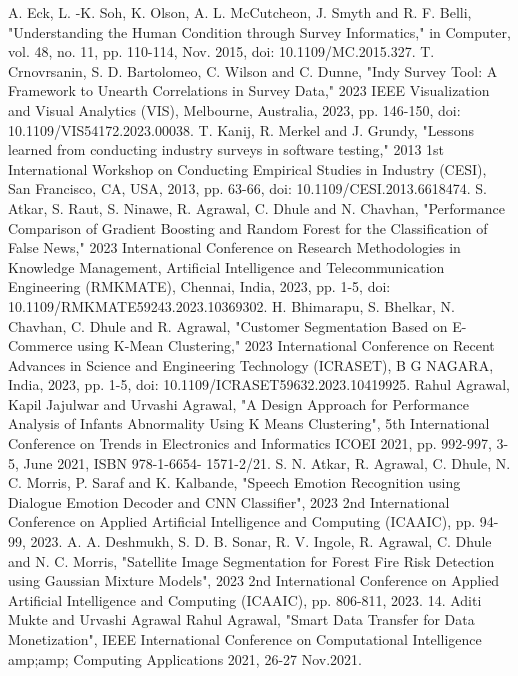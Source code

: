 \documentclass[conference]{IEEEtran}
\begin{document}
\begin{thebibliography}{00}
 A. Eck, L. -K. Soh, K. Olson, A. L. McCutcheon, J. Smyth and R. F. Belli, "Understanding the Human Condition through Survey Informatics," in Computer, vol. 48, no. 11, pp. 110-114, Nov. 2015, doi: 10.1109/MC.2015.327.
 T. Crnovrsanin, S. D. Bartolomeo, C. Wilson and C. Dunne, "Indy Survey Tool: A Framework to Unearth Correlations in Survey Data," 2023 IEEE Visualization and Visual Analytics (VIS), Melbourne, Australia, 2023, pp. 146-150, doi: 10.1109/VIS54172.2023.00038. 
 T. Kanij, R. Merkel and J. Grundy, "Lessons learned from conducting industry surveys in software testing," 2013 1st International Workshop on Conducting Empirical Studies in Industry (CESI), San Francisco, CA, USA, 2013, pp. 63-66, doi: 10.1109/CESI.2013.6618474. 
	S. Atkar, S. Raut, S. Ninawe, R. Agrawal, C. Dhule and N. Chavhan, "Performance Comparison of Gradient Boosting and Random Forest for the Classification of False News," 2023 International Conference on Research Methodologies in Knowledge Management, Artificial Intelligence and Telecommunication Engineering (RMKMATE), Chennai, India, 2023, pp. 1-5, doi: 10.1109/RMKMATE59243.2023.10369302. 
	H. Bhimarapu, S. Bhelkar, N. Chavhan, C. Dhule and R. Agrawal, "Customer Segmentation Based on E-Commerce using K-Mean Clustering," 2023 International Conference on Recent Advances in Science and Engineering Technology (ICRASET), B G NAGARA, India, 2023, pp. 1-5, doi: 10.1109/ICRASET59632.2023.10419925. 
	Rahul Agrawal, Kapil Jajulwar and Urvashi Agrawal, "A Design Approach for Performance Analysis of Infants Abnormality Using K Means Clustering", 5th International Conference on Trends in Electronics and Informatics ICOEI 2021, pp. 992-997, 3-5, June 2021, ISBN 978-1-6654- 1571-2/21.
	S. N. Atkar, R. Agrawal, C. Dhule, N. C. Morris, P. Saraf and K. Kalbande, "Speech Emotion Recognition using Dialogue Emotion Decoder and CNN Classifier", 2023 2nd International Conference on Applied Artificial Intelligence and Computing (ICAAIC), pp. 94-99, 2023.
 A. A. Deshmukh, S. D. B. Sonar, R. V. Ingole, R. Agrawal, C. Dhule and N. C. Morris, "Satellite Image Segmentation for Forest Fire Risk Detection using Gaussian Mixture Models", 2023 2nd International Conference on Applied Artificial Intelligence and Computing (ICAAIC), pp. 806-811, 2023.
	14. Aditi Mukte and Urvashi Agrawal Rahul Agrawal, "Smart Data Transfer for Data Monetization", IEEE International Conference on Computational Intelligence amp;amp; Computing Applications 2021, 26-27 Nov.2021.

\end{thebibliography}
\end{document}
